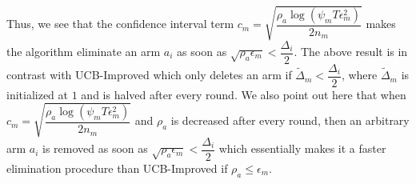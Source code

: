 \begin{remark}
\label{Result:Rem:7}	
	Thus, we see that the confidence interval term $c_{m}=\sqrt{\dfrac{\rho_{a}\log (\psi_{m}T\epsilon_{m}^{2})}{2 n_{m}}}$ makes the algorithm eliminate an arm $a_{i}$ as soon as $\sqrt{\rho_{a}\epsilon_{m}}<\dfrac{\Delta_{i}}{2}$. The above result is in contrast with UCB-Improved which only deletes an arm if $\tilde{\Delta}_{m}<\dfrac{\Delta_{i}}{2}$, where $\tilde{\Delta}_{m}$ is initialized at $1$ and is halved after every round. We also point out here that when $c_{m}=\sqrt{\dfrac{\rho_{a}\log (\psi_{m}T\epsilon_{m}^{2})}{2 n_{m}}}$ and $\rho_{a}$ is decreased after every round, then an arbitrary arm $a_{i}$ is removed as soon as  $\sqrt{\rho_{a}\epsilon_{m}}<\dfrac{\Delta_{i}}{2}$ which essentially makes it a faster elimination procedure than UCB-Improved if $\rho_{a}\leq \epsilon_{m}$.
\end{remark}

